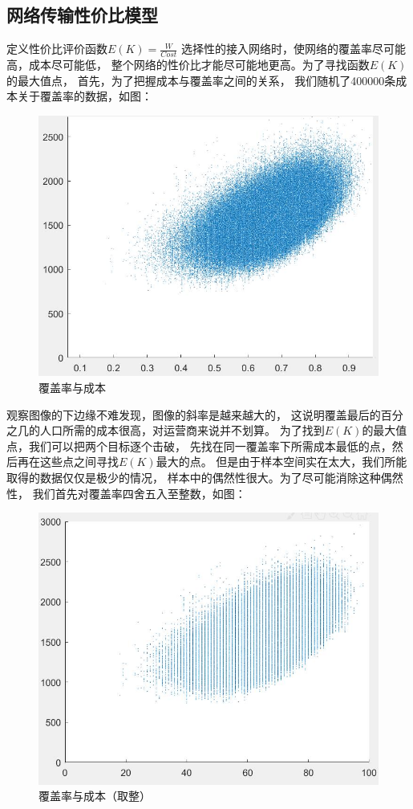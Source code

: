 \documentclass[UTF8,12pt]{ctexart}
\begin{document}
    \subsection{网络传输性价比模型}\label{WLCSXJB}
        定义性价比评价函数$E(K)=\frac{W}{Cost}$
        选择性的接入网络时，使网络的覆盖率尽可能高，成本尽可能低，
        整个网络的性价比才能尽可能地更高。为了寻找函数$E(K)$的最大值点，
        首先，为了把握成本与覆盖率之间的关系，
        我们随机了400000条成本关于覆盖率的数据，如图：
        \begin{figure}[H]
            \centering
            \includegraphics[scale=0.38]{400000.jpg}
            \caption{覆盖率与成本}
            \end{figure} 
        观察图像的下边缘不难发现，图像的斜率是越来越大的，
        这说明覆盖最后的百分之几的人口所需的成本很高，对运营商来说并不划算。
        为了找到$E(K)$的最大值点，我们可以把两个目标逐个击破，
        先找在同一覆盖率下所需成本最低的点，然后再在这些点之间寻找$E(K)$最大的点。
        但是由于样本空间实在太大，我们所能取得的数据仅仅是极少的情况，
        样本中的偶然性很大。为了尽可能消除这种偶然性，
        我们首先对覆盖率四舍五入至整数，如图：
        \begin{figure}[H]
            \centering
            \includegraphics[scale=0.38]{400000z.jpg}
            \caption{覆盖率与成本（取整）}
            \end{figure}
\end{document}
